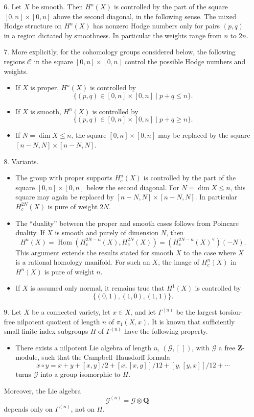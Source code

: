 \documentclass[10pt]{amsart}
\theoremstyle{plain}
\theoremstyle{definition}
\theoremstyle{remark}
\DeclareMathOperator{\Hom}{Hom}
\begin{document}
6. Let $X$ be smooth. Then $H^n(X)$ is controlled by the part of the square $[0,n]\times[0,n]$ above the second diagonal, in the following sense. The mixed Hodge structure on $H^n(X)$ has nonzero Hodge numbers only for pairs $(p,q)$ in a region dictated by smoothness. In particular the weights range from $n$ to $2n$.

7. More explicitly, for the cohomology groups considered below, the following regions $\mathscr C$ in the square $[0,n]\times[0,n]$ control the possible Hodge numbers and weights.
\begin{itemize}
\item[(7.1)] If $X$ is proper, $H^n(X)$ is controlled by
\[
\{(p,q)\in[0,n]\times[0,n]\mid p+q\le n\}.
\]
\item[(7.2)] If $X$ is smooth, $H^n(X)$ is controlled by
\[
\{(p,q)\in[0,n]\times[0,n]\mid p+q\ge n\}.
\]
\item[(7.3)] If $N=\dim X\le n$, the square $[0,n]\times[0,n]$ may be replaced by the square $[n-N,N]\times[n-N,N]$.
\end{itemize}

8. Variants.
\begin{itemize}
\item[(8.1)] The group with proper supports $H_c^n(X)$ is controlled by the part of the square $[0,n]\times[0,n]$ below the second diagonal. For $N=\dim X\le n$, this square may again be replaced by $[n-N,N]\times[n-N,N]$. In particular $H_c^{2N}(X)$ is pure of weight $2N$.

\item[(8.2)] The ``duality'' between the proper and smooth cases follows from Poincare duality. If $X$ is smooth and purely of dimension $N$, then
\[
H^n(X)=\Hom(H_c^{2N-n}(X),H_c^{2N}(X))=(H_c^{2N-n}(X)^\vee)(-N).
\]
This argument extends the results stated for smooth $X$ to the case where $X$ is a rational homology manifold. For such an $X$, the image of $H_c^n(X)$ in $H^n(X)$ is pure of weight $n$.

\item[(8.3)] If $X$ is assumed only normal, it remains true that $H^1(X)$ is controlled by
\[
\{(0,1),(1,0),(1,1)\}.
\]
\end{itemize}

9. Let $X$ be a connected variety, let $x\in X$, and let $\Gamma^{(n)}$ be the largest torsion-free nilpotent quotient of length $n$ of $\pi_1(X,x)$. It is known that sufficiently small finite-index subgroups $H$ of $\Gamma^{(n)}$ have the following property.
\begin{itemize}
\item[($*$)] There exists a nilpotent Lie algebra of length $n$, $(\mathscr G,[\,])$, with $\mathscr G$ a free $\mathbf Z$-module, such that the Campbell--Hausdorff formula
\[
x\circ y=x+y+[x,y]/2+[x,[x,y]]/12+[y,[y,x]]/12+\cdots
\]
turns $\mathscr G$ into a group isomorphic to $H$.
\end{itemize}
Moreover, the Lie algebra
\[
\mathscr G^{(n)}=\mathscr G\otimes\mathbf Q
\]
depends only on $\Gamma^{(n)}$, not on $H$.
\end{document}
